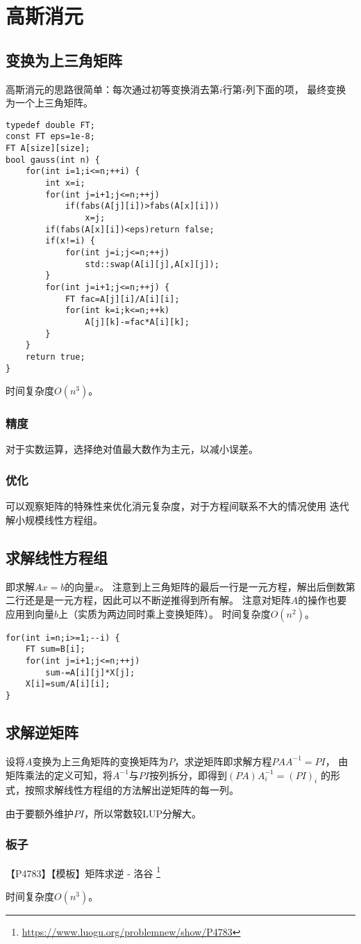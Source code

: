 \section{高斯消元}
\subsection{变换为上三角矩阵}
高斯消元的思路很简单：每次通过初等变换消去第$i$行第$i$列下面的项，
最终变换为一个上三角矩阵。
\begin{lstlisting}[title=gauss]
typedef double FT;
const FT eps=1e-8;
FT A[size][size];
bool gauss(int n) {
    for(int i=1;i<=n;++i) {
        int x=i;
        for(int j=i+1;j<=n;++j)
            if(fabs(A[j][i])>fabs(A[x][i]))
                x=j;
        if(fabs(A[x][i])<eps)return false;
        if(x!=i) {
            for(int j=i;j<=n;++j)
                std::swap(A[i][j],A[x][j]);
        }
        for(int j=i+1;j<=n;++j) {
            FT fac=A[j][i]/A[i][i];
            for(int k=i;k<=n;++k)
                A[j][k]-=fac*A[i][k];
        }
    }
    return true;
}
\end{lstlisting}
时间复杂度$O(n^3)$。
\subsubsection{精度}
对于实数运算，选择绝对值最大数作为主元，以减小误差。
\subsubsection{优化}
可以观察矩阵的特殊性来优化消元复杂度，对于方程间联系不大的情况使用
迭代解小规模线性方程组。
\subsection{求解线性方程组}\label{LSE}
即求解$Ax=b$的向量$x$。
注意到上三角矩阵的最后一行是一元方程，解出后倒数第二行还是是一元方程，因此可以不断逆推得到所有解。
注意对矩阵$A$的操作也要应用到向量$b$上（实质为两边同时乘上变换矩阵）。
时间复杂度$O(n^2)$。
\begin{lstlisting}
for(int i=n;i>=1;--i) {
    FT sum=B[i];
    for(int j=i+1;j<=n;++j)
        sum-=A[i][j]*X[j];
    X[i]=sum/A[i][i];
}
\end{lstlisting}
\subsection{求解逆矩阵}\label{InvMatGauss}
设将$A$变换为上三角矩阵的变换矩阵为$P$，求逆矩阵即求解方程$PAA^{-1}=PI$，
由矩阵乘法的定义可知，将$A^{-1}$与$PI$按列拆分，即得到$(PA)A_i^{-1}=(PI)_i$
的形式，按照求解线性方程组的方法解出逆矩阵的每一列。

由于要额外维护$PI$，所以常数较LUP分解大。

\subsubsection{板子}

【P4783】【模板】矩阵求逆 - 洛谷
\footnote{\url{https://www.luogu.org/problemnew/show/P4783}}

时间复杂度$O(n^3)$。
